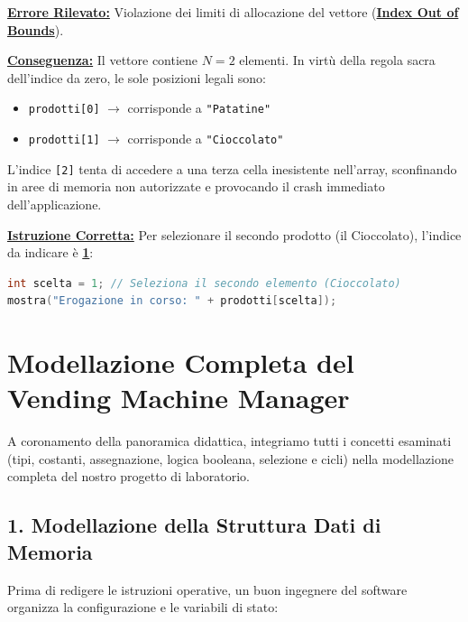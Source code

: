 \begin{soluzione}
\textbf{\underline{Errore Rilevato:}} Violazione dei limiti di allocazione del vettore (\textbf{\underline{Index Out of Bounds}}).

\vspace{0.3em}
\textbf{\underline{Conseguenza:}} Il vettore contiene $N = 2$ elementi. In virtù della regola sacra dell'indice da zero, le sole posizioni legali sono:
\begin{itemize}
  \item \texttt{prodotti[0]} $\to$ corrisponde a \texttt{"Patatine"}
  \item \texttt{prodotti[1]} $\to$ corrisponde a \texttt{"Cioccolato"}
\end{itemize}
L'indice \texttt{[2]} tenta di accedere a una terza cella inesistente nell'array, sconfinando in aree di memoria non autorizzate e provocando il crash immediato dell'applicazione.

\vspace{0.3em}
\textbf{\underline{Istruzione Corretta:}} Per selezionare il secondo prodotto (il Cioccolato), l'indice da indicare è \textbf{\underline{1}}:
\begin{lstlisting}[language=C++]
int scelta = 1; // Seleziona il secondo elemento (Cioccolato)
mostra("Erogazione in corso: " + prodotti[scelta]);
\end{lstlisting}
\end{soluzione}

\section{Modellazione Completa del Vending Machine Manager}

A coronamento della panoramica didattica, integriamo tutti i concetti esaminati (tipi, costanti, assegnazione, logica booleana, selezione e cicli) nella modellazione completa del nostro progetto di laboratorio.

\subsection{1. Modellazione della Struttura Dati di Memoria}

Prima di redigere le istruzioni operative, un buon ingegnere del software organizza la configurazione e le variabili di stato:

